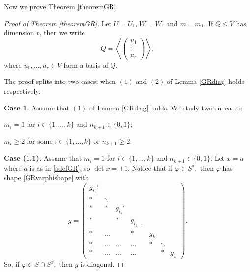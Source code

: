 \documentclass[a4paper,reqno,11pt]{amsart}
\theoremstyle{definition}
\theoremstyle{remark}
\numberwithin{equation}{section}
\begin{document}
Now we prove Theorem \ref{theoremGR}.

\begin{proof}[Proof of Theorem {\rm \ref{theoremGR}}]
Let $U=U_1$, $W=W_1$ and $m=m_1.$ If  $Q \le V$ has dimension $r$, then we write 
\begin{equation} \label{Qnotation}
Q= \left \langle 
\begin{pmatrix}
u_1 \\
 \vdots \\
u_r
\end{pmatrix}
\right \rangle,
\end{equation}
where $u_1, \ldots, u_r \in V$ form a basis of $Q$.

The proof splits into two cases: when $(1)$ and $(2)$ of Lemma \ref{GRdiag} holds respectively.

\medskip

{\bf Case 1.} Assume that $(1)$ of Lemma \ref{GRdiag} holds. We study two subcases:
\begin{description}[before={\renewcommand\makelabel[1]{\bfseries ##1}}]
\item[{\bf Case (1.1)}] $m_i=1$ for $i \in \{1, \ldots, k\}$ and $n_{k+1} \in \{0,1\}$;
\item[{\bf Case (1.2)}] $m_i\ge 2$ for some $i \in \{1, \ldots, k\}$ or $n_{k+1}\ge 2.$
\end{description}

\medskip

{\bf Case (1.1).} Assume that $m_i=1$ for $i \in \{1, \ldots, k\}$ and $n_{k+1} \in \{0,1\}.$ Let $x=a$ where $a$ is as in \eqref{adefGR}, so $\det x = \pm 1$. Notice that if $\varphi \in S^x,$ then $\varphi$  has shape \eqref{GRvarphishape} with 
\begin{equation}
\label{GRginsy}
g= \begin{pmatrix}
g_{i_1}' & & & & & & \\
* & \ddots & & & & &\\
* & *&g_{i_s}' &  & & &\\
* & &* &g_{i_{k+1}} & & & \\
* &\ldots & &* & g_{k} & & \\
* &\ldots &\ldots& \ldots &*  & \ddots &\\
* &\ldots &\ldots &\ldots & &* &  g_{1}
\end{pmatrix}.
\end{equation}
So, if $\varphi \in S \cap S^x,$ then $g$ is diagonal.


\end{proof}
\end{document}
